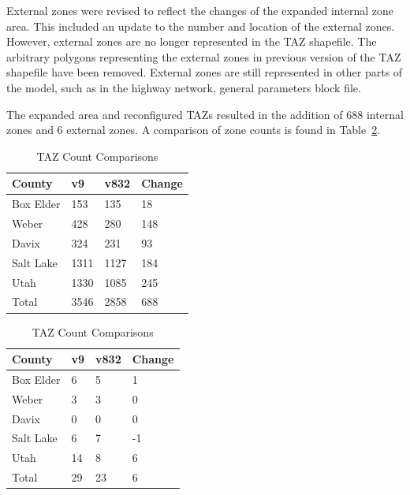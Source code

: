 \documentclass[
  letterpaper,
  DIV=11,
  numbers=noendperiod,
  titlepage=false]{scrreprt}
\begin{document}
External zones were revised to reflect the changes of the expanded
internal zone area. This included an update to the number and location
of the external zones. However, external zones are no longer represented
in the TAZ shapefile. The arbitrary polygons representing the external
zones in previous version of the TAZ shapefile have been removed.
External zones are still represented in other parts of the model, such
as in the highway network, general parameters block file.

The expanded area and reconfigured TAZs resulted in the addition of 688
internal zones and 6 external zones. A comparison of zone counts is
found in Table~\ref{tbl-taz-count}.

\newpage

\begin{table}

\caption{\label{tbl-taz-count}TAZ Count
Comparisons}\begin{minipage}[t]{0.50\linewidth}

{\centering 

\begin{tabular}[t]{llll}
\toprule
County & v9 & v832 & Change\\
\midrule
Box Elder & 153 & 135 & 18\\
Weber & 428 & 280 & 148\\
Davix & 324 & 231 & 93\\
Salt Lake & 1311 & 1127 & 184\\
Utah & 1330 & 1085 & 245\\
Total & 3546 & 2858 & 688\\
\bottomrule
\end{tabular}

}

\end{minipage}%
%
\begin{minipage}[t]{0.50\linewidth}

{\centering 

\begin{tabular}[t]{llll}
\toprule
County & v9 & v832 & Change\\
\midrule
Box Elder & 6 & 5 & 1\\
Weber & 3 & 3 & 0\\
Davix & 0 & 0 & 0\\
Salt Lake & 6 & 7 & -1\\
Utah & 14 & 8 & 6\\
Total & 29 & 23 & 6\\
\bottomrule
\end{tabular}

}

\end{minipage}%

\end{table}
\end{document}
